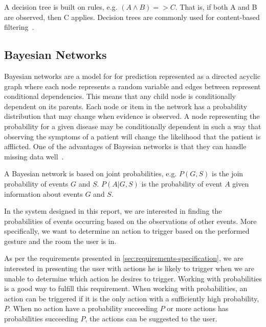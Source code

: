 A decision tree is built on rules, e.g. $(A \wedge B) => C$. That is, if both A and B are observed, then C applies. Decision trees are commonly used for content-based filtering~\cite{adomavicius2005toward}.

\subsection{Bayesian Networks}
\label{sec:analysis:recommender-methods:bayesian-networks}

Bayesian networks are a model for for prediction represented as a directed acyclic graph where each node represents a random variable and edges between represent conditional dependencies.
This means that any child node is conditionally dependent on its parents.
Each node or item in the network has a probability distribution that may change when evidence is observed.
A node representing the probability for a given disease may be conditionally dependent in such a way that observing the symptoms of a patient will change the likelihood that the patient is afflicted.
One of the advantages of Bayesian networks is that they can handle missing data well~\cite{heckerman2008tutorial}. 

A Bayesian network is based on joint probabilities, e.g. $P(G,S)$ is the join probability of events $G$ and $S$. $P(A|G,S)$ is the probability of event $A$ given information about events $G$ and $S$.

In the system designed in this report, we are interested in finding the probabilities of events occurring based on the observations of other events. More specifically, we want to determine an action to trigger based on the performed gesture and the room the user is in.

As per the requirements presented in \ref{sec:requirements-specification}, we are interested in presenting the user with actions he is likely to trigger when we are unable to determine which action he desires to trigger. Working with probabilities is a good way to fulfill this requirement. When working with probabilities, an action can be triggered if it is the only action with a sufficiently high probability, $P$. When no action have a probability succeeding $P$ or more actions has probabilities succeeding $P$, the actions can be suggested to the user.


